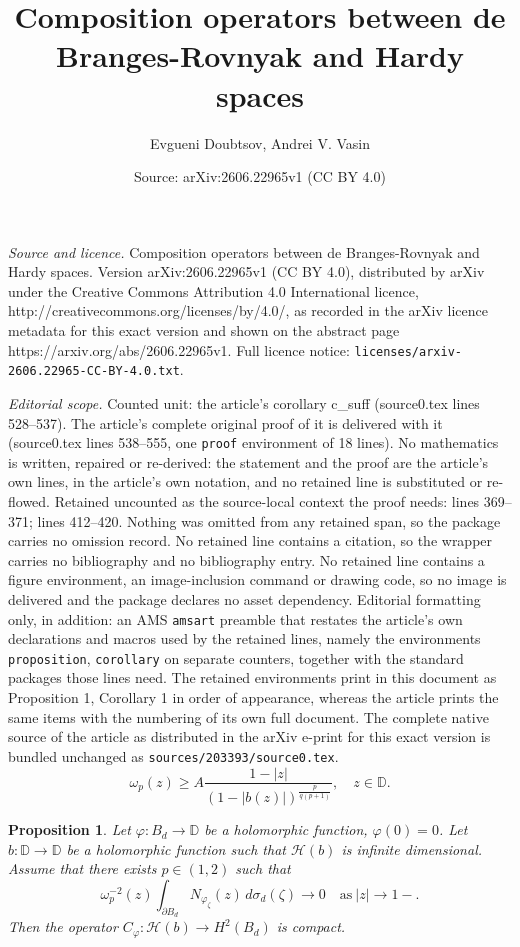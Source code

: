 \documentclass[10pt,a4paper]{amsart}
\title{Composition operators between de Branges-Rovnyak and Hardy spaces}
\author{Evgueni Doubtsov, Andrei V. Vasin}
\date{Source: arXiv:2606.22965v1 (CC BY 4.0)}
\newtheorem{proposition}{Proposition}
\newcommand{\Dbb}{\mathbb D}
\newcommand{\bd}{{B_d}}
\newcommand{\cph}{C_\varphi}
\newcommand{\dbr}{\mathcal{H}}
\newcommand{\meal}{\sigma_d}
\newcommand{\om}{\omega}
\newcommand{\ph}{\varphi}
\newcommand{\spd}{\partial B_d}
\newcommand{\za}{\zeta}
\begin{document}
\maketitle

\noindent\emph{Source and licence.} Composition operators between de Branges-Rovnyak and Hardy spaces. Version arXiv:2606.22965v1 (CC BY 4.0), distributed by arXiv under the Creative Commons Attribution 4.0 International licence, http://creativecommons.org/licenses/by/4.0/, as recorded in the arXiv licence metadata for this exact version and shown on the abstract page https://arxiv.org/abs/2606.22965v1. Full licence notice: \texttt{licenses/arxiv-2606.22965-CC-BY-4.0.txt}.\par\smallskip

\noindent\textit{Editorial scope.} Counted unit: the article's corollary c\_suff (source0.tex lines 528--537). The article's complete original proof of it is delivered with it (source0.tex lines 538--555, one \texttt{proof} environment of 18 lines). No mathematics is written, repaired or re-derived: the statement and the proof are the article's own lines, in the article's own notation, and no retained line is substituted or re-flowed.  Retained uncounted as the source-local context the proof needs: lines 369--371; lines 412--420.  Nothing was omitted from any retained span, so the package carries no omission record.  No retained line contains a citation, so the wrapper carries no bibliography and no bibliography entry.  No retained line contains a figure environment, an image-inclusion command or drawing code, so no image is delivered and the package declares no asset dependency.  Editorial formatting only, in addition: an AMS \texttt{amsart} preamble that restates the article's own declarations and macros used by the retained lines, namely the environments \texttt{proposition}, \texttt{corollary} on separate counters, together with the standard packages those lines need.  The retained environments print in this document as Proposition 1, Corollary 1 in order of appearance, whereas the article prints the same items with the numbering of its own full document.  The complete native source of the article as distributed in the arXiv e-print for this exact version is bundled unchanged as \texttt{sources/203393/source0.tex}.
\begin{equation}\label{e_om_p_A}
\om_p(z)\ge A \frac{1-|z|}{\left(1- |b(z)| \right)^{\frac{p}{q(p+1)}}}, \quad z \in \Dbb.
\end{equation}

\begin{proposition}\label{p_suff}
Let $\ph: \bd \to \Dbb$ be a holomorphic function, $\ph(0)=0$.
Let $b:\Dbb \to \Dbb$ be a holomorphic function such that $\dbr(b)$ is infinite dimensional.
Assume that there exists $p\in (1,2)$ such that
\begin{equation}\label{e_om2Neva0}
\om_p^{-2}(z) \int_{\spd} N_{\ph_\za} (z)\, d\meal(\za) \to 0\quad \textrm{as}\ |z|\to 1-.
\end{equation}
Then the operator $\cph: \dbr(b) \to H^2(\bd)$ is compact.
\end{proposition}
\end{document}
